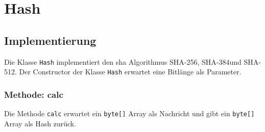 \chapter{Hash}
\label{chap:hash}

\section{Implementierung}
Die Klasse \texttt{Hash} implementiert den \gls{sha} Algorithmus \glqq SHA-256\grqq, \glqq SHA-384\grqq und \glqq SHA-512\grqq.
Der Constructor der Klasse \texttt{Hash} erwartet eine Bitlänge als Parameter.

\subsection{Methode: calc}
Die Methode \texttt{calc} erwartet ein \texttt{byte[]} Array als Nachricht und gibt ein \texttt{byte[]} Array als Hash zurück.
